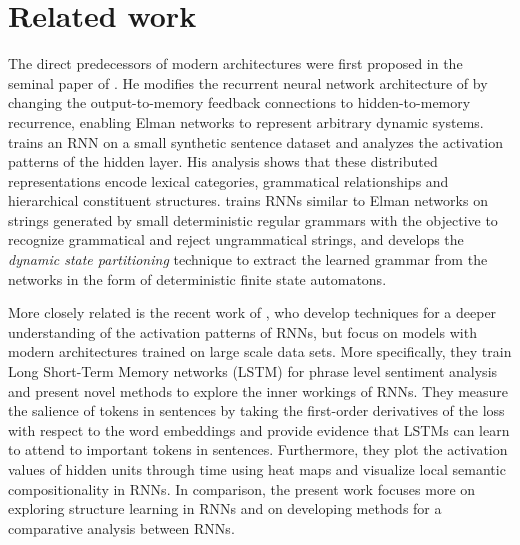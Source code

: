 \section{Related work}
\label{sec:related}

The direct predecessors of modern architectures were first proposed in the 
seminal paper of . He modifies the recurrent 
neural network architecture of  by changing the output-to-memory 
feedback connections to hidden-to-memory recurrence, enabling Elman networks to 
represent arbitrary dynamic systems.  trains an RNN on a small synthetic
sentence  dataset and analyzes the activation patterns of the hidden
layer. His analysis shows that these distributed representations  
encode lexical categories, grammatical relationships and hierarchical constituent 
structures.  trains RNNs similar to Elman
networks on strings generated by small 
deterministic regular grammars with the objective to recognize grammatical and reject ungrammatical 
strings, and develops the \emph{dynamic state partitioning} technique to extract the learned 
grammar from the networks in the form of deterministic finite state
automatons.

More closely related is the recent work of , who develop techniques 
for a deeper understanding of the activation patterns of RNNs, but focus on models with 
modern architectures trained on large scale data sets. More specifically, they train Long 
Short-Term Memory networks (LSTM) \cite{hochreiter1997long} 
for phrase level sentiment analysis 
and present novel methods 
to explore the inner workings of RNNs. They measure the salience of tokens
in sentences by taking the first-order derivatives of the loss with respect to the
word embeddings and provide evidence 
that LSTMs can learn to attend to important tokens in sentences. Furthermore,
they plot the activation values of hidden units through time using heat maps 
and visualize local semantic compositionality in RNNs. 
In comparison, the present work focuses more on exploring structure 
learning in RNNs and on developing methods for a comparative analysis between RNNs.

